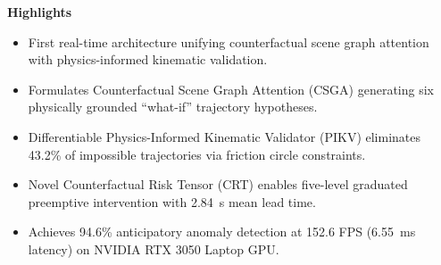 \documentclass[preprint,12pt]{elsarticle}
\begin{document}
\textbf{Highlights}
\begin{itemize}
     \item First real-time architecture unifying counterfactual scene graph attention with physics-informed kinematic validation.
     \item Formulates Counterfactual Scene Graph Attention (CSGA) generating six physically grounded ``what-if'' trajectory hypotheses.
     \item Differentiable Physics-Informed Kinematic Validator (PIKV) eliminates 43.2\% of impossible trajectories via friction circle constraints.
     \item Novel Counterfactual Risk Tensor (CRT) enables five-level graduated preemptive intervention with 2.84~s mean lead time.
     \item Achieves 94.6\% anticipatory anomaly detection at 152.6 FPS (6.55~ms latency) on NVIDIA RTX 3050 Laptop GPU.
\end{itemize}
\end{document}
